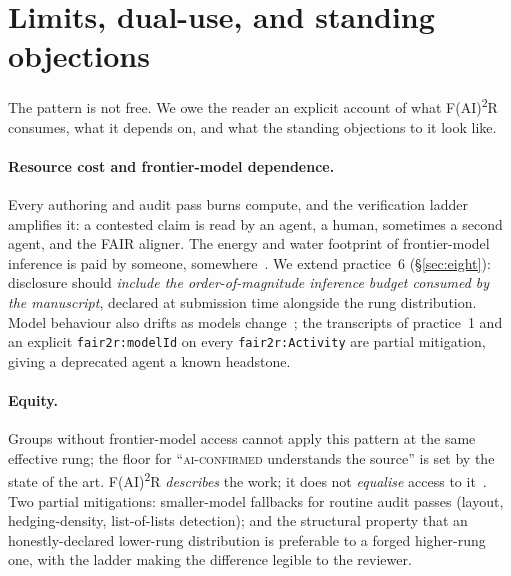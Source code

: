 \section{Limits, dual-use, and standing objections}
\label{sec:limits-and-objections}

The pattern is not free. We owe the reader an explicit account of
what F(AI)\textsuperscript{2}R consumes, what it depends on, and
what the standing objections to it look like.

\paragraph{Resource cost and frontier-model dependence.}
Every authoring and audit pass burns compute, and the verification
ladder amplifies it: a contested claim is read by an agent, a
human, sometimes a second agent, and the FAIR aligner. The energy
and water footprint of frontier-model inference is paid by someone,
somewhere~\cite{strubell2019energy,patterson2021carbon,luccioni2024power,li2023thirsty}.
We extend practice~6 (\S\ref{sec:eight}): disclosure should
\emph{include the order-of-magnitude inference budget consumed by
the manuscript}, declared at submission time alongside the rung
distribution. Model behaviour also drifts as models
change~\cite{chen2023drift}; the transcripts
of practice~1 and an explicit \texttt{fair2r:modelId} on every
\texttt{fair2r:Activity} are partial mitigation, giving a
deprecated agent a known headstone.

\paragraph{Equity.}
Groups without frontier-model access cannot apply this pattern at
the same effective rung; the floor for ``\textsc{ai-confirmed}
understands the source'' is set by the state of the
art. F(AI)\textsuperscript{2}R \emph{describes} the work; it does
not \emph{equalise} access to
it~\cite{bender2021stochastic,birhane2022values,oecd2023aiscience}.
Two partial mitigations: smaller-model fallbacks for routine
audit passes (layout, hedging-density, list-of-lists detection);
and the structural property that an honestly-declared lower-rung
distribution is preferable to a forged higher-rung one, with the
ladder making the difference legible to the reviewer.

